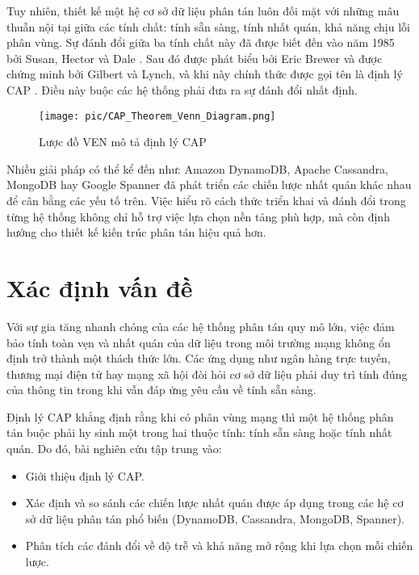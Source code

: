 \documentclass[conference]{IEEEtran}
\begin{document}
Tuy nhiên, thiết kế một hệ cơ sở dữ liệu phân tán luôn đối mặt với những mâu thuẫn nội tại giữa các tính chất: tính sẵn sàng, tính nhất quán, khả năng chịu lỗi phân vùng. Sự đánh đổi giữa ba tính chất này đã được biết đến vào năm 1985 bởi Susan, Hector và Dale \cite{davidson}. Sau đó được phát biểu bởi Eric Brewer \cite{brewer} và được chứng minh bởi Gilbert và Lynch, và khi này chính thức được gọi tên là định lý CAP \cite{gilbert}. Điều này buộc các hệ thống phải đưa ra sự đánh đổi nhất định.
\begin{figure}[h]
    \centering
    \texttt{[image: pic/CAP\_Theorem\_Venn\_Diagram.png]}
    \caption{Lược đồ VEN mô tả định lý CAP}
    \label{fig:ven}
\end{figure}

Nhiều giải pháp có thể kể đến như: Amazon DynamoDB, Apache Cassandra, MongoDB hay Google Spanner đã phát triển các chiến lược nhất quán khác nhau để cân bằng các yếu tố trên. Việc hiểu rõ cách thức triển khai và đánh đổi trong từng hệ thống không chỉ hỗ trợ việc lựa chọn nền tảng phù hợp, mà còn định hướng cho thiết kế kiến trúc phân tán hiệu quả hơn.
\section{Xác định vấn đề}   
Với sự gia tăng nhanh chóng của các hệ thống phân tán quy mô lớn, việc đảm bảo tính toàn vẹn và nhất quán của dữ liệu trong môi trường mạng không ổn định trở thành một thách thức lớn. Các ứng dụng như ngân hàng trực tuyến, thương mại điện tử hay mạng xã hội đòi hỏi cơ sở dữ liệu phải duy trì tính đúng của thông tin trong khi vẫn đáp ứng yêu cầu về tính sẵn sàng.

Định lý CAP khẳng định rằng khi có phân vùng mạng thì một hệ thống phân tán buộc phải hy sinh một trong hai thuộc tính: tính sẵn sàng hoặc tính nhất quán. Do đó, bài nghiên cứu tập trung vào:
\begin{itemize}
    \item Giới thiệu định lý CAP.
    \item Xác định và so sánh các chiến lược nhất quán được áp dụng trong các hệ cơ sở dữ liệu phân tán phổ biến (DynamoDB, Cassandra, MongoDB, Spanner).
    \item Phân tích các đánh đổi về độ trễ và khả năng mở rộng khi lựa chọn mỗi chiến lược.
\end{itemize}
\end{document}
